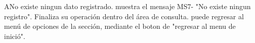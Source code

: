 	\begin{UCtrayectoriaA}{A}{No existe ningun dato registrado.}
		\UCpaso muestra el mensaje MS7- "No existe ningun registro".
		\UCpaso[\UCactor] Finaliza su operación dentro del área de consulta.
		\UCpaso[\UCactor] puede regresar al menú de opciones de la sección, mediante el boton de "regresar al menu de inició".
		\end{UCtrayectoriaA}
	
